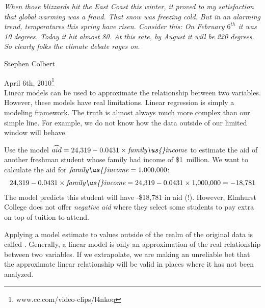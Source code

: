 
{\em\small When those blizzards hit the East Coast this winter,
it proved to my satisfaction that global warming was a fraud.
That snow was freezing cold.
But in an alarming trend, temperatures this spring have risen.
Consider this: On February $6^{th}$ it was 10 degrees.
Today it hit almost 80. At this rate, by August it will be
220 degrees.
So clearly folks the climate debate rages on.\vspace{0.5mm}}

\noindent\hspace{\textwidth}\hspace{-40mm}Stephen Colbert

\noindent\hspace{\textwidth}\hspace{-40mm}April 6th,
2010\footnote{
    {www.cc.com/video-clips/l4nkoq}} \\

Linear models can be used to approximate the relationship
between two variables.
However, these models have real limitations.
Linear regression is simply a modeling framework.
The truth is almost always much more complex than our simple line.
For example, we do not know how the data outside of our limited
window will behave.

\begin{examplewrap}
\begin{nexample}{Use the model
    $\widehat{aid}
      = \text{24,319} - 0.0431 \times
          \textit{family\us{}income}$
    to estimate the aid of another freshman student whose
    family had income of \$1~million.}
  We want to calculate the aid for
  $\textit{family\us{}income} = \text{1,000,000}$:
  \begin{align*}
  \text{24,319} - 0.0431\times \textit{family\us{}income}
    = \text{24,319} - 0.0431\times \text{1,000,000}
    = -\text{18,781}
  \end{align*}
  The model predicts this student will have -\$18,781 in aid (!).
  However, Elmhurst College does not offer \emph{negative aid}
  where they select some students to pay extra on top of tuition
  to attend.
\end{nexample}
\end{examplewrap}

Applying a model estimate to values outside of the realm of the
original data is called .
Generally, a linear model is only an approximation of the real
relationship between two variables.
If we extrapolate, we are making an unreliable bet that the
approximate linear relationship will be valid in places where
it has not been analyzed.

